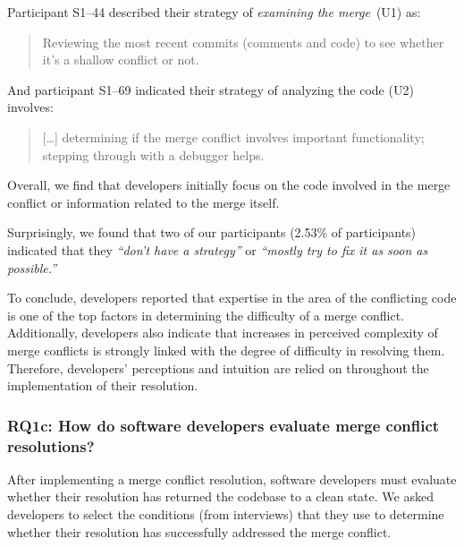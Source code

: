 Participant S1--44 described their strategy of \textit{examining the merge}~(U1) as:
\begin{quotation}
	Reviewing the most recent commits (comments and code) to see whether it's a shallow conflict or not.
\end{quotation}
	And participant S1--69 indicated their strategy of analyzing the code (U2) involves:
\begin{quotation}
[\ldots] determining if the merge conflict involves important functionality; stepping through with a debugger helps.
\end{quotation}
Overall, we find that developers initially focus on the code involved in the merge conflict or information related to the merge itself.

Surprisingly, we found that two of our participants (2.53\% of participants) indicated that they \textit{``don't have a strategy''} or \textit{``mostly try to fix it as soon as possible.''}


To conclude, developers reported that expertise in the area of the conflicting code is one of the top factors in determining the difficulty of a merge conflict.
Additionally, developers also indicate that increases in perceived complexity of merge conflicts is strongly linked with the degree of difficulty in resolving them.
Therefore, developers' perceptions and intuition are relied on throughout the implementation of their resolution.

\subsubsection{\textbf{RQ1c}: How do software developers \textbf{evaluate} merge conflict resolutions?}\label{RQ1c}

After implementing a merge conflict resolution, software developers must evaluate whether their resolution has returned the codebase to a clean state.
We asked developers to select the conditions (from interviews) that they use to determine whether their resolution has successfully addressed the merge conflict.

